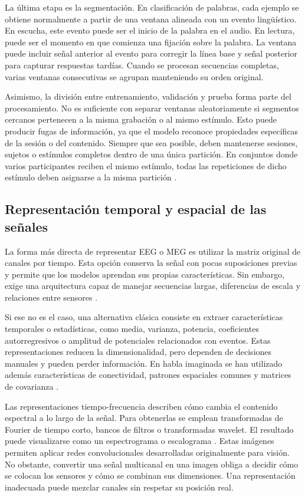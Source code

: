 La última etapa es la segmentación. En clasificación de palabras, cada ejemplo se obtiene normalmente a partir de una ventana alineada con un evento lingüístico. En escucha, este evento puede ser el inicio de la palabra en el audio. En lectura, puede ser el momento en que comienza una fijación sobre la palabra. La ventana puede incluir señal anterior al evento para corregir la línea base y señal posterior para capturar respuestas tardías. Cuando se procesan secuencias completas, varias ventanas consecutivas se agrupan manteniendo su orden original.

Asimismo, la división entre entrenamiento, validación y prueba forma parte del procesamiento. No es suficiente con separar ventanas aleatoriamente si segmentos cercanos pertenecen a la misma grabación o al mismo estímulo. Esto puede producir fugas de información, ya que el modelo reconoce propiedades específicas de la sesión o del contenido. Siempre que sea posible, deben mantenerse sesiones, sujetos o estímulos completos dentro de una única partición. En conjuntos donde varios participantes reciben el mismo estímulo, todas las repeticiones de dicho estímulo deben asignarse a la misma partición \cite{harris2021nonsense}.

\subsection{Representación temporal y espacial de las señales}

La forma más directa de representar EEG o MEG es utilizar la matriz original de canales por tiempo. Esta opción conserva la señal con pocas suposiciones previas y permite que los modelos aprendan sus propias características. Sin embargo, exige una arquitectura capaz de manejar secuencias largas, diferencias de escala y relaciones entre sensores \cite{roy2019eegdeep}.

Si ese no es el caso, una alternativa clásica consiste en extraer características temporales o estadísticas, como media, varianza, potencia, coeficientes autorregresivos o amplitud de potenciales relacionados con eventos. Estas representaciones reducen la dimensionalidad, pero dependen de decisiones manuales y pueden perder información. En habla imaginada se han utilizado además características de conectividad, patrones espaciales comunes y matrices de covarianza \cite{panachakel2021covert,alzahrani2024systematic}.

Las representaciones tiempo-frecuencia describen cómo cambia el contenido espectral a lo largo de la señal. Para obtenerlas se emplean transformadas de Fourier de tiempo corto, bancos de filtros o transformadas wavelet. El resultado puede visualizarse como un espectrograma o escalograma \cite{dascoli2025words,roy2019eegdeep}. Estas imágenes permiten aplicar redes convolucionales desarrolladas originalmente para visión. No obstante, convertir una señal multicanal en una imagen obliga a decidir cómo se colocan los sensores y cómo se combinan sus dimensiones. Una representación inadecuada puede mezclar canales sin respetar su posición real.

